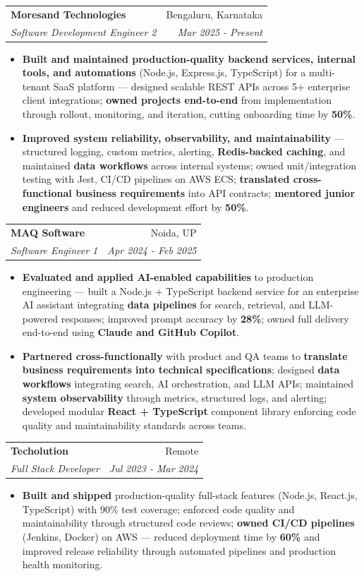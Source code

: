 \documentclass[a4paper,20pt]{article}
\makeatletter
\newcommand{\resumeSubheading}[4]{
  \vspace{-1pt}\item
    \begin{tabular*}{0.97\textwidth}{l@{\extracolsep{\fill}}r}
      \textbf{#1} & #2 \\
      \textit{#3} & \textit{#4} \\
    \end{tabular*}\vspace{-5pt}
}
\newcommand{\resumeItemListStart}{\begin{itemize}}
\newcommand{\resumeItemListEnd}{\end{itemize}\vspace{-5pt}}
\makeatother
\begin{document}
   \resumeSubheading{Moresand Technologies}{Bengaluru, Karnataka}
      {Software Development Engineer 2}{Mar 2025 - Present}
      \resumeItemListStart

 \item \textnormal{\textbf{Built and maintained production-quality backend services, internal tools, and automations} (Node.js, Express.js, TypeScript) for a multi-tenant SaaS platform — designed scalable REST APIs across 5+ enterprise client integrations; \textbf{owned projects end-to-end} from implementation through rollout, monitoring, and iteration, cutting onboarding time by \textbf{50\%}.}

    \item \textnormal{\textbf{Improved system reliability, observability, and maintainability} — structured logging, custom metrics, alerting, \textbf{Redis-backed caching}, and maintained \textbf{data workflows} across internal systems; owned unit/integration testing with Jest, CI/CD pipelines on AWS ECS; \textbf{translated cross-functional business requirements} into API contracts; \textbf{mentored junior engineers} and reduced development effort by \textbf{50\%}.}

\resumeItemListEnd

\resumeSubheading{MAQ Software}{Noida, UP}
      {Software Engineer 1}{Apr 2024 - Feb 2025}
      \resumeItemListStart

\item \textnormal{\textbf{Evaluated and applied AI-enabled capabilities} to production engineering — built a Node.js + TypeScript backend service for an enterprise AI assistant integrating \textbf{data pipelines} for search, retrieval, and LLM-powered responses; improved prompt accuracy by \textbf{28\%}; owned full delivery end-to-end using \textbf{Claude and GitHub Copilot}.}

\item \textnormal{\textbf{Partnered cross-functionally} with product and QA teams to \textbf{translate business requirements into technical specifications}; designed \textbf{data workflows} integrating search, AI orchestration, and LLM APIs; maintained \textbf{system observability} through metrics, structured logs, and alerting; developed modular \textbf{React + TypeScript} component library enforcing code quality and maintainability standards across teams.}

\resumeItemListEnd

    \resumeSubheading{Techolution}{Remote}
      {Full Stack Developer}{Jul 2023 - Mar 2024}
      \resumeItemListStart
     \item \textnormal{\textbf{Built and shipped} production-quality full-stack features (Node.js, React.js, TypeScript) with 90\% test coverage; enforced code quality and maintainability through structured code reviews; \textbf{owned CI/CD pipelines} (Jenkins, Docker) on AWS — reduced deployment time by \textbf{60\%} and improved release reliability through automated pipelines and production health monitoring.}
      \resumeItemListEnd
\end{document}
